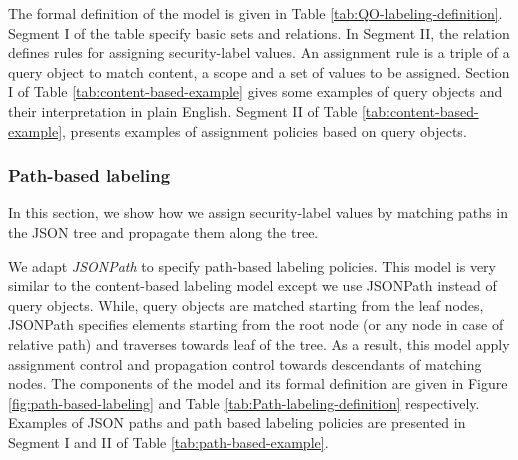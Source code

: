 The formal definition of the model is given in Table \ref{tab:QO-labeling-definition}. Segment I of the table specify basic sets and relations. In Segment II, the relation \textit{ } defines rules for assigning security-label values. An assignment rule is a triple of a query object to match content, a scope and a set of values to be assigned.  Section I of  Table \ref{tab:content-based-example} gives some examples of query objects and their interpretation in plain English.  Segment II of Table \ref{tab:content-based-example}, presents examples of assignment policies based on query objects.





\subsubsection{Path-based labeling}

In this section, we show how we assign security-label values by matching paths in the JSON tree and propagate them along the tree. 

We adapt \textit{JSONPath} \cite{JSONPath} to specify path-based labeling policies. This model is very similar to the content-based labeling model except we use JSONPath instead of query objects. While, query objects are matched starting from the leaf nodes, JSONPath specifies elements starting from the root node (or any node in case of relative path) and traverses towards leaf of the tree. As a result, this model apply assignment control and propagation control towards descendants of matching nodes.  The components of the model and its formal definition are given in Figure \ref{fig:path-based-labeling} and Table \ref{tab:Path-labeling-definition} respectively. Examples of JSON paths and path based labeling policies are presented in Segment I and II of Table \ref{tab:path-based-example}.


